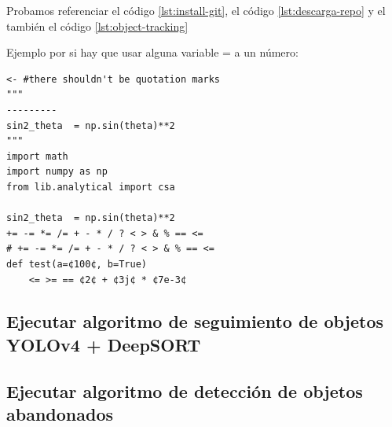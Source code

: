Probamos referenciar el código \ref{lst:install-git}, el código \ref{lst:descarga-repo} y el también el código \ref{lst:object-tracking}

Ejemplo por si hay que usar alguna variable = a un número:

\begin{lstlisting}[language=iPython]
<- #there shouldn't be quotation marks
"""
---------
sin2_theta  = np.sin(theta)**2
"""
import math
import numpy as np
from lib.analytical import csa

sin2_theta  = np.sin(theta)**2
+= -= *= /= + - * / ? < > & % == <=
# += -= *= /= + - * / ? < > & % == <=
def test(a=¢100¢, b=True)
    <= >= == ¢2¢ + ¢3j¢ * ¢7e-3¢
\end{lstlisting}

\newpage

\subsection{Ejecutar algoritmo de seguimiento de objetos YOLOv4 + DeepSORT}
\label{subsec:ejecutar-seguimiento-yolov4-deepsort}

\newpage

\subsection{Ejecutar algoritmo de detección de objetos abandonados}
\label{subsec:ejecutar-deteccion-abandoned-object}



